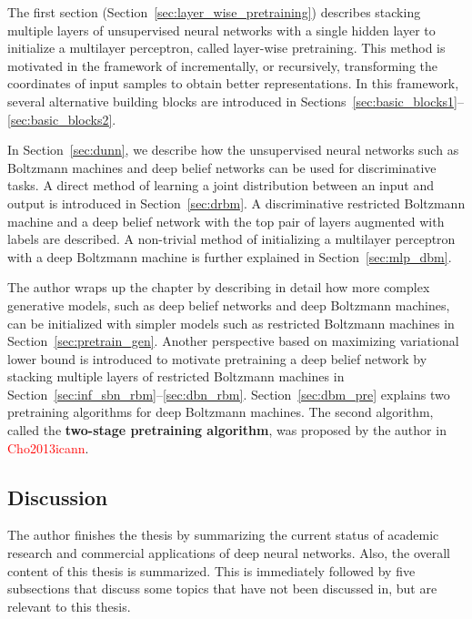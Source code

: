 \documentclass{now}
\newcommand{\alert}[1]{\textcolor{red}{#1}}
\newcommand{\citepub}[1]{\alert{#1}}
\begin{document}
The first section (Section~\ref{sec:layer_wise_pretraining})
describes stacking multiple layers of unsupervised neural
networks with a single hidden layer to initialize a
multilayer perceptron, called layer-wise
pretraining. This method is motivated in the framework of
incrementally, or recursively, transforming the coordinates
of input samples to obtain better representations. In this
framework, several alternative building blocks are
introduced in
Sections~\ref{sec:basic_blocks1}--\ref{sec:basic_blocks2}.

In Section~\ref{sec:dunn}, we describe how the unsupervised
neural networks such as Boltzmann machines and deep belief
networks can be used for discriminative tasks. A direct
method of learning a joint distribution between an input and
output is introduced in Section~\ref{sec:drbm}. A
discriminative restricted Boltzmann machine and a
deep belief network with the top pair of layers augmented
with labels are described. A non-trivial method of
initializing a multilayer perceptron with a deep Boltzmann
machine is further explained in Section~\ref{sec:mlp_dbm}.

The author wraps up the chapter by describing in detail how
more complex generative models, such as deep belief networks
and deep Boltzmann machines, can be initialized with simpler
models such as restricted Boltzmann machines in
Section~\ref{sec:pretrain_gen}. Another perspective based on
maximizing variational lower bound is introduced to motivate
pretraining a deep belief network by stacking multiple
layers of restricted Boltzmann machines in
Section~\ref{sec:inf_sbn_rbm}--\ref{sec:dbn_rbm}.
Section~\ref{sec:dbm_pre}  explains two pretraining
algorithms for deep Boltzmann machines. The second
algorithm, called the \textbf{two-stage pretraining
algorithm}, was proposed by the author in
\citepub{Cho2013icann}.

\subsection{Discussion}

The author finishes the thesis by summarizing the current
status of academic research and commercial applications of
deep neural networks. Also, the overall content of this
thesis is summarized. 
This is immediately followed by five subsections that
discuss some topics that have not been discussed
in, but are relevant to this thesis.
\end{document}
